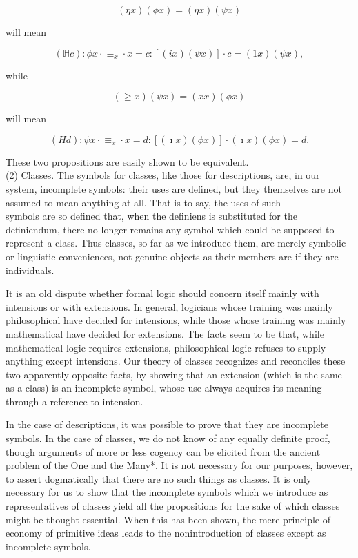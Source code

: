 \documentclass[10pt]{article}
\begin{document}
$$
(\eta x)(\phi x)=(\eta x)(\psi x)
$$

will mean

$$
(\mathbb{H} c): \phi x \cdot \equiv_{x} \cdot x=c:[(i x)(\psi x)] \cdot c=(1 x)(\psi x),
$$

while

$$
(\geqslant x)(\psi x)=(x x)(\phi x)
$$

will mean

$$
(H d): \psi x \cdot \equiv_{x} \cdot x=d:[(\imath x)(\phi x)] \cdot(\imath x)(\phi x)=d .
$$

These two propositions are easily shown to be equivalent.\\
(2) Classes. The symbols for classes, like those for descriptions, are, in our system, incomplete symbols: their uses are defined, but they themselves are not assumed to mean anything at all. That is to say, the uses of such\\
symbols are so defined that, when the definiens is substituted for the definiendum, there no longer remains any symbol which could be supposed to represent a class. Thus classes, so far as we introduce them, are merely symbolic or linguistic conveniences, not genuine objects as their members are if they are individuals.

It is an old dispute whether formal logic should concern itself mainly with intensions or with extensions. In general, logicians whose training was mainly philosophical have decided for intensions, while those whose training was mainly mathematical have decided for extensions. The facts seem to be that, while mathematical logic requires extensions, philosophical logic refuses to supply anything except intensions. Our theory of classes recognizes and reconciles these two apparently opposite facts, by showing that an extension (which is the same as a class) is an incomplete symbol, whose use always acquires its meaning through a reference to intension.

In the case of descriptions, it was possible to prove that they are incomplete symbols. In the case of classes, we do not know of any equally definite proof, though arguments of more or less cogency can be elicited from the ancient problem of the One and the Many*. It is not necessary for our purposes, however, to assert dogmatically that there are no such things as classes. It is only necessary for us to show that the incomplete symbols which we introduce as representatives of classes yield all the propositions for the sake of which classes might be thought essential. When this has been shown, the mere principle of economy of primitive ideas leads to the nonintroduction of classes except as incomplete symbols.
\end{document}
